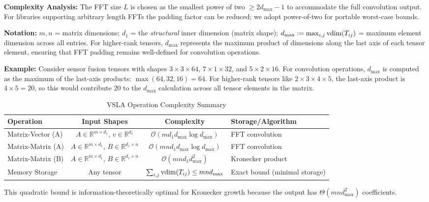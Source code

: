 \textbf{Complexity Analysis:} The FFT size $L$ is chosen as the smallest power of two $\geq 2d_{\max} - 1$ to accommodate the full convolution output. For libraries supporting arbitrary length FFTs the padding factor can be reduced; we adopt power-of-two for portable worst-case bounds.

\textbf{Notation:} $m, n$ = matrix dimensions; $d_1$ = the \emph{structural} inner dimension (matrix shape); $d_{\max} := \max_{i,j} \operatorname{vdim}(T_{ij})$ = maximum element dimension across all entries. For higher-rank tensors, $d_{\max}$ represents the maximum product of dimensions along the last axis of each tensor element, ensuring that FFT padding remains well-defined for convolution operations.

\textbf{Example:} Consider sensor fusion tensors with shapes $3 \times 3 \times 64$, $7 \times 1 \times 32$, and $5 \times 2 \times 16$. For convolution operations, $d_{\max}$ is computed as the maximum of the last-axis products: $\max(64, 32, 16) = 64$. For higher-rank tensors like $2 \times 3 \times 4 \times 5$, the last-axis product is $4 \times 5 = 20$, so this would contribute $20$ to the $d_{\max}$ calculation across all tensor elements in the matrix.

\begin{table}[h]
\centering
\footnotesize
\begin{tabular}{lccp{4cm}}
\hline
\textbf{Operation} & \textbf{Input Shapes} & \textbf{Complexity} & \textbf{Storage/Algorithm} \\
\hline
Matrix-Vector (A) & $A \in \mathbb{R}^{m \times d_1}$, $v \in \mathbb{R}^{d_1}$ & $\mathcal{O}(md_1d_{\max}\log d_{\max})$ & FFT convolution \\
Matrix-Matrix (A) & $A \in \mathbb{R}^{m \times d_1}$, $B \in \mathbb{R}^{d_1 \times n}$ & $\mathcal{O}(mnd_1d_{\max}\log d_{\max})$ & FFT convolution \\
Matrix-Matrix (B) & $A \in \mathbb{R}^{m \times d_1}$, $B \in \mathbb{R}^{d_1 \times n}$ & $\mathcal{O}(mnd_1d_{\max}^2)$ & Kronecker product \\
Memory Storage & Any tensor & $\sum_{i,j}\operatorname{vdim}(T_{ij}) \leq mnd_{\max}$ & Exact bound (minimal storage) \\
\hline
\end{tabular}
\caption{VSLA Operation Complexity Summary}
\label{tab:complexity}
\end{table}

This quadratic bound is information-theoretically optimal for Kronecker growth because the output has $\Theta(mn d_{\max}^2)$ coefficients.


